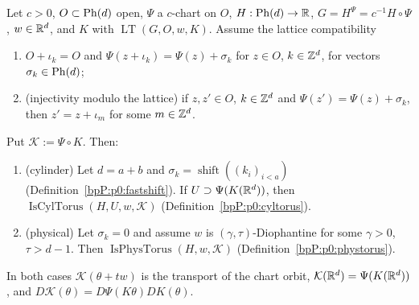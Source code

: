 \begin{theorem}\label{bpP:p1:torus-transport}
Let $c>0$, $O\subset\mathrm{Ph}(d)$ open, $\Psi$ a $c$-chart on $O$, $H:\mathrm{Ph}(d)\to\mathbb{R}$, $G=H^\Psi=c^{-1}H\circ\Psi$, $w\in\mathbb{R}^d$, and $K$ with $\operatorname{LT}(G,O,w,K)$. Assume the lattice compatibility
\begin{enumerate}[label=(Q\arabic*)]
\item $O+\iota_k=O$ and $\Psi(z+\iota_k)=\Psi(z)+\sigma_k$ for $z\in O$, $k\in\mathbb{Z}^d$, for vectors $\sigma_k\in\mathrm{Ph}(d)$;
\item (injectivity modulo the lattice) if $z,z'\in O$, $k\in\mathbb{Z}^d$ and $\Psi(z')=\Psi(z)+\sigma_k$, then $z'=z+\iota_m$ for some $m\in\mathbb{Z}^d$.
\end{enumerate}
Put $\mathcal K:=\Psi\circ K$. Then:
\begin{enumerate}[label=(\alph*)]
\item \textup{(cylinder)} Let $d=a+b$ and $\sigma_k=\operatorname{shift}((k_i)_{i<a})$ (Definition~\ref{bpP:p0:fastshift}). If $U\supset\Psi(K(\mathbb{R}^d))$, then $\operatorname{IsCylTorus}(H,U,w,\mathcal K)$ (Definition~\ref{bpP:p0:cyltorus}).
\item \textup{(physical)} Let $\sigma_k=0$ and assume $w$ is $(\gamma,\tau)$-Diophantine for some $\gamma>0$, $\tau>d-1$. Then $\operatorname{IsPhysTorus}(H,w,\mathcal K)$ (Definition~\ref{bpP:p0:phystorus}).
\end{enumerate}
In both cases $\mathcal K(\theta+t w)$ is the transport of the chart orbit, $\mathcal K(\mathbb{R}^d)=\Psi(K(\mathbb{R}^d))$, and $D\mathcal K(\theta)=D\Psi(K\theta)DK(\theta)$.
\end{theorem}
